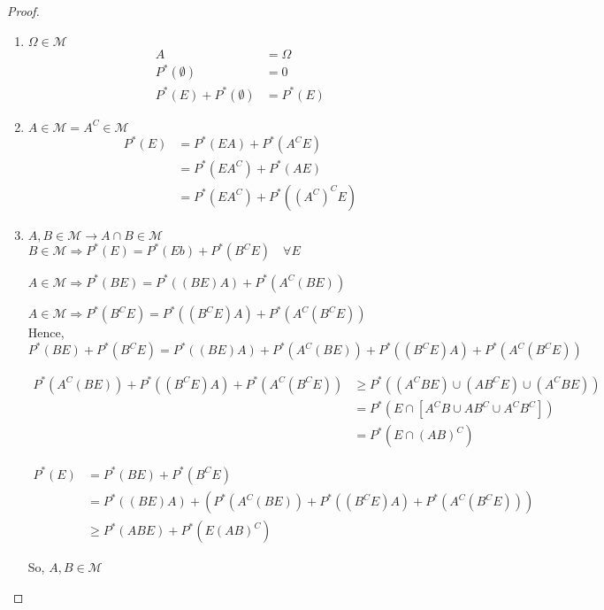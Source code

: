 \documentclass[11pt,fleqn]{book} %
\begin{document}
\begin{proof}


\begin{enumerate}[label = (\roman*)]
	\item $\Omega \in \mathscr{M}$\\

	$$\begin{aligned}
			A &= \Omega\\
			P^*(\emptyset) &= 0\\
			P^*(E) + P^*(\emptyset) &= P^*(E)
		\end{aligned}$$

	\item $A \in \mathscr{M} = A^C \in \mathscr{M}$\\

	$$\begin{aligned}
		P^*(E) &= P^*(EA) + P^*(A^C E)\\
		&= P^*(EA^C) + P^*(A E)\\
		&= P^*(EA^C) + P^*((A^C)^C E)
	\end{aligned}$$

	\item $A, B \in \mathscr{M} \rightarrow A \cap B \in \mathscr{M}$\\

	$B \in \mathscr{M} \Rightarrow P^*(E) = P^*(Eb) + P^*(B^C E) \quad \forall E$

	$A \in \mathscr{M} \Rightarrow P^*(BE) = P^*((BE)A) + P^*(A^C (BE))$

	$A \in \mathscr{M} \Rightarrow P^*(B^CE) = P^*((B^CE)A) + P^*(A^C (B^CE))$\\

	Hence, \\
	
	$$P^*(BE) + P^*(B^CE) = P^*((BE)A) + P^*(A^C (BE)) + P^*((B^CE)A) + P^*(A^C (B^CE))$$

	$$\begin{aligned}
		P^*(A^C (BE)) + P^*((B^CE)A) + P^*(A^C (B^CE)) &\geq P^*((A^C BE) \cup (AB^CE)\cup(A^CBE))\\
			&= P^*(E\cap[A^CB\cup  AB^C\cup A^CB^C])\\
			&= P^*(E \cap (AB)^C)
	\end{aligned} $$

	$$\begin{aligned}
		P^*(E) &= P^*(BE) + P^*(B^CE)\\
		&= P^*((BE)A) + (P^*(A^C (BE)) + P^*((B^CE)A) + P^*(A^C (B^CE)))\\
		&\geq P^*(ABE) + P^*(E(AB)^C)
	\end{aligned} $$
	
	 

	So, $A,B \in \mathscr{M}$
\end{enumerate}
\end{proof}
\end{document}
